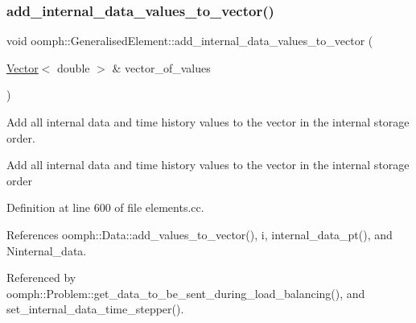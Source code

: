 \mbox{\label{classoomph_1_1GeneralisedElement_a3f15bfeb2a705f8acfa529967077bc20}} 
\subsubsection{\texorpdfstring{add\+\_\+internal\+\_\+data\+\_\+values\+\_\+to\+\_\+vector()}{add\_internal\_data\_values\_to\_vector()}}
{\footnotesize\ttfamily void oomph\+::\+Generalised\+Element\+::add\+\_\+internal\+\_\+data\+\_\+values\+\_\+to\+\_\+vector (\begin{DoxyParamCaption}\item[{\hyperlink{classoomph_1_1Vector}{Vector}$<$ double $>$ \&}]{vector\+\_\+of\+\_\+values }\end{DoxyParamCaption})}



Add all internal data and time history values to the vector in the internal storage order. 

Add all internal data and time history values to the vector in the internal storage order 

Definition at line 600 of file elements.\+cc.



References oomph\+::\+Data\+::add\+\_\+values\+\_\+to\+\_\+vector(), i, internal\+\_\+data\+\_\+pt(), and Ninternal\+\_\+data.



Referenced by oomph\+::\+Problem\+::get\+\_\+data\+\_\+to\+\_\+be\+\_\+sent\+\_\+during\+\_\+load\+\_\+balancing(), and set\+\_\+internal\+\_\+data\+\_\+time\+\_\+stepper().

\mbox{\label{classoomph_1_1GeneralisedElement_ab3af7347c1269583d2409d30415b5016}} 
